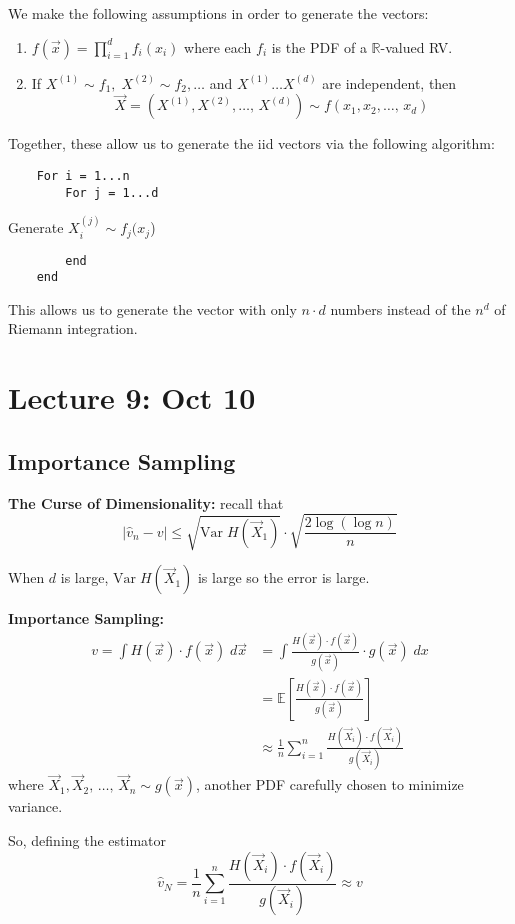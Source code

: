 \documentclass[12pt]{article}
\renewcommand{\hat}[1]{\widehat{#1}}
\newcommand{\R}{\mathbb{R}}
\newcommand{\E}{\mathbb{E}}
\newcommand{\Var}{\text{Var}\;}
\begin{document}
We make the following assumptions in order to generate the vectors:
\begin{enumerate}
    \item $f(\vec x) = \prod_{i=1}^d f_i(x_i)$ where each $f_i$ is the PDF of a $\R$-valued RV. 
    \item If $X^{(1)} \sim f_1, \; X^{(2)} \sim f_2, \dots$ and $X^{(1)} \dots X^{(d)}$ are independent, then 
    \[\vec X = (X^{(1)}, X^{(2)}, \dots,\, X^{(d)}) \sim f(x_1, x_2, \dots,\, x_d)\]
\end{enumerate}
Together, these allow us to generate the iid vectors via the following algorithm: 
\begin{verbatim}
    For i = 1...n
        For j = 1...d
\end{verbatim}
\qquad \qquad \qquad Generate $X_i^{(j)} \sim f_j(x_j$)
\begin{verbatim}
        end
    end
\end{verbatim}

This allows us to generate the vector with only $n \cdot d$ numbers instead of the $n^{d}$ of Riemann integration. 

\section*{Lecture 9: Oct 10}
\subsection*{Importance Sampling}
\textbf{The Curse of Dimensionality:} recall that 
\[\big \vert \hat v_n - v\big\vert \leq \sqrt{\Var H(\vec X_1)} \cdot \sqrt{\frac{2\log(\log n)}{n}}\]

When $d$ is large, $\Var H(\vec X_1)$ is large so the error is large.


\textbf{Importance Sampling:}
\begin{align*}
    v = \int H(\vec x) \cdot f(\vec x)\; d\vec x &= \int \frac{H(\vec x) \cdot f(\vec x)}{g(\vec x)} \cdot g(\vec x)\; dx\\
    &= \E[\frac{H(\vec x) \cdot f(\vec x)}{g(\vec x)}]\\ 
    &\approx \frac{1}{n} \sum_{i=1}^n \frac{H(\vec X_i) \cdot f(\vec X_i)}{g(\vec X_i)} 
\end{align*}
where $\vec X_1, \vec X_2, \, \dots,\, \vec X_n \sim g(\vec x)$, another PDF carefully chosen to minimize variance. 

So, defining the estimator 
\[\hat v_N = \frac{1}{n}\sum_{i=1}^n \frac{H(\vec X_i) \cdot f(\vec X_i)}{g(\vec X_i)}\approx v\]
\end{document}

